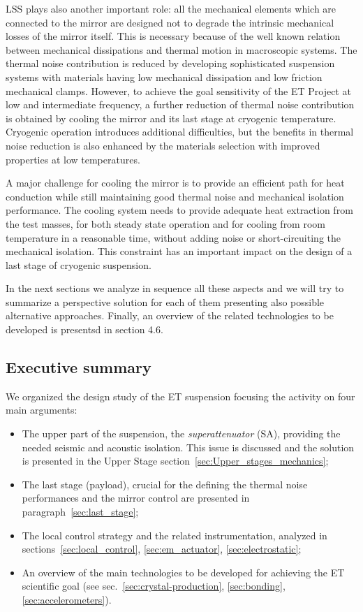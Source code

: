 \noindent
LSS plays also another important role: all the mechanical elements which are connected 
to the mirror are designed not to degrade the intrinsic mechanical losses of the 
mirror itself. This is necessary because of the well known relation between mechanical 
dissipations and thermal motion in macroscopic systems. The thermal noise contribution 
is reduced by developing sophisticated suspension systems with materials having low 
mechanical dissipation and low friction mechanical clamps. However, to achieve  
the goal sensitivity of the ET Project at low and intermediate frequency, 
a further reduction of thermal noise contribution is obtained by cooling the mirror 
and its last stage at cryogenic temperature\cite{ricci_moriond}. Cryogenic operation 
introduces additional difficulties, but the benefits in thermal noise reduction 
is also enhanced by the materials selection with improved properties at low 
temperatures. 

\noindent
A major challenge for cooling the mirror is to provide an efficient path for heat 
conduction while still maintaining good thermal noise and mechanical isolation performance. 
The cooling system needs to provide adequate heat extraction from the test masses, 
for both steady state operation and for cooling from room temperature in a reasonable 
time, without adding noise or short-circuiting the mechanical isolation. This constraint 
has an important impact on the design of a last stage of cryogenic suspension.

In the next sections we analyze in sequence all these aspects and we will try to summarize 
a perspective solution for each of them presenting also possible alternative approaches. 
Finally, an overview of the related technologies to be developed is presentsd in section 4.6.

%
\FloatBarrier
\FloatBarrier
\subsection{Executive summary}
%

We organized the design study of the ET suspension focusing the activity on four main arguments:
\begin{itemize}
\item {The upper part of the suspension, the \emph{superattenuator} (SA),  providing 
the needed seismic and acoustic isolation. This issue is discussed and the solution 
is presented in the Upper Stage section~\ref{sec:Upper_stages_mechanics}; }
\item{The last stage (payload), crucial for the defining the thermal noise 
performances and the mirror control are presented in paragraph~\ref{sec:last_stage};}
\item{The local control strategy and the related instrumentation, analyzed in 
sections~\ref{sec:local_control}, \ref{sec:em_actuator}, \ref{sec:electrostatic};}
\item{An overview of the main technologies to be developed for achieving the ET 
scientific goal (see sec.~\ref{sec:crystal-production}, \ref{sec:bonding}, 
\ref{sec:accelerometers}).} 
\end{itemize} 


